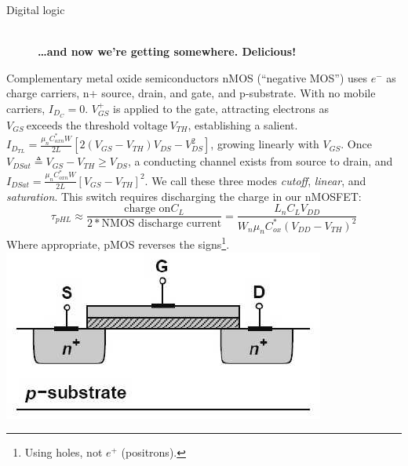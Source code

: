 \documentclass[mathserif,xcolor={dvipsnames,table}]{beamer}
\begin{document}
\begin{frame}{Digital logic}
\begin{figure}
\begin{center}
\\
\tiny{\textbf{\ldots and now we're getting somewhere. Delicious!}}
\end{center}
\end{figure}
\end{frame}

\begin{frame}{Complementary metal oxide semiconductors}
\renewcommand\windowpagestuff{%
\texttt{[image: images/vtf.png]}
\par{\usebeamercolor[fg]{caption name}%
\usebeamerfont*{caption name}%
\usebeamertemplate{caption label separator}}%
\usebeamerfont*{caption}%
}
\opencutleft
{\scriptsize nMOS (``negative MOS'') uses
$e^{-}$ as charge carriers, n+ source, drain, and gate, and p-substrate. With no
mobile carriers, $I_{D_{C}} = 0$. $V^{+}_{GS}$
is applied to the gate, attracting electrons as $V_{GS}\ \text{exceeds the threshold
voltage}\ V_{TH}$, establishing a salient.
$I_{D_{TL}} = \frac{\mu_{n}C^{*}_{oxn}W}{2L}\left[2(V_{GS} - V_{TH})V_{DS} - V^{2}_{DS}\right]$, growing
linearly with $V_{GS}$. Once $V_{DSat}\triangleq V_{GS} - V_{TH} \ge V_{DS}$, a
conducting channel exists from source to drain, and $I_{DSat} = \frac{\mu_{n}C^{*}_{oxn}W}{2L}\left[V_{GS} - V_{TH}\right]^{2}$. We call these three modes \textit{cutoff},
\textit{linear}, and \textit{saturation}. This switch requires discharging the charge in our nMOSFET:\\
\begin{equation}
\tau_{pHL} \approx \frac{\text{charge on} C_L}{2 * \text{NMOS discharge current}} = \frac{L_{n}C_{L}V_{DD}}{W_{n}\mu_{n}C^{*}_{ox}\left(V_{DD} - V_{TH}\right)^{2}}
\end{equation}
Where appropriate, pMOS reverses the signs\footnote{Using holes, not $e^{+}$ (positrons).}.
}
\\
\vfill
\includegraphics[scale=.3]{images/oe-001.png}

\end{frame}
\end{document}
